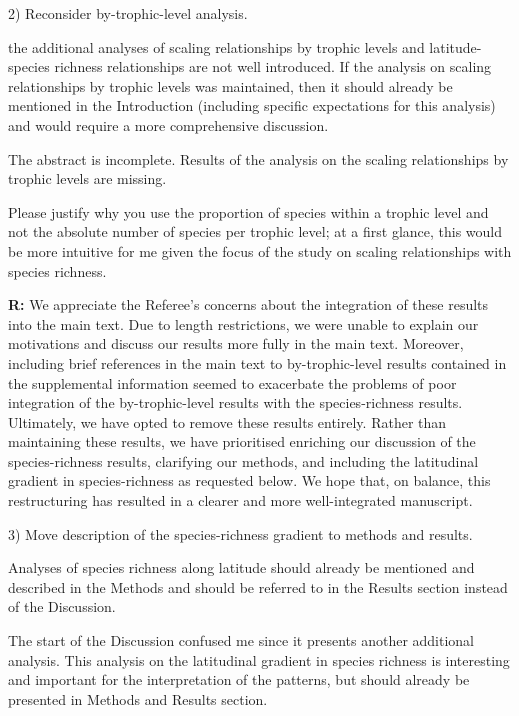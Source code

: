 \documentclass[12pt]{letter}
\newenvironment{refquote}{\bigskip \begin{it}}{\end{it}\smallskip}
\begin{document}
  2) Reconsider by-trophic-level analysis.

  \begin{refquote}

    the additional analyses of scaling relationships by trophic levels and
    latitude-species richness relationships are not well introduced. If the
    analysis on scaling relationships by trophic levels was maintained, then
    it should already be mentioned in the Introduction (including specific
    expectations for this analysis) and would require a more comprehensive
    discussion.

    \smallskip

    The abstract is incomplete. Results of the analysis on the scaling
    relationships by trophic levels are missing.

    \smallskip

    Please justify why you use the proportion of species within a trophic
    level and not the absolute number of species per trophic level; at a first
    glance, this would be more intuitive for me given the focus of the study
    on scaling relationships with species richness.

  \end{refquote}


  \textbf{R:} We appreciate the Referee's concerns about 
  the integration of these results into the main text. Due 
  to length restrictions, we were unable to explain our 
  motivations and discuss our results more fully in the main
  text. Moreover, including brief references in the
  main text to by-trophic-level results contained in
  the supplemental information seemed to exacerbate
  the problems of poor integration of the by-trophic-level results with the 
  species-richness results. Ultimately, we have opted to remove
  these results entirely. Rather than maintaining 
  these results, we have prioritised enriching
  our discussion of the species-richness results, clarifying our
  methods, and including the latitudinal gradient in species-richness
  as requested below. We hope that, on balance, this restructuring has
  resulted in a clearer and more well-integrated manuscript.


  3) Move description of the species-richness gradient to methods and results.


  \begin{refquote}

     Analyses of species richness along latitude should already be mentioned
     and described in the Methods and should be referred to in the Results
     section instead of the Discussion.

     \smallskip

      The start of the Discussion confused me since it presents another
      additional analysis. This analysis on the latitudinal gradient in
      species richness is interesting and important for the interpretation of
      the patterns, but should already be presented in Methods and Results
      section.

  \end{refquote}
\end{document}
